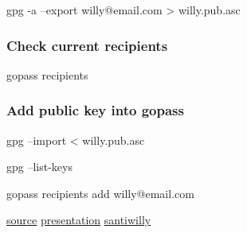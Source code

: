 \documentclass[9pt,english,a4paper,]{scrartcl}
\newenvironment{Shaded}{}{}
\newcommand{\ExtensionTok}[1]{#1}
\newcommand{\NormalTok}[1]{#1}
\newcommand{\OperatorTok}[1]{\textcolor[rgb]{0.40,0.40,0.40}{#1}}
\begin{document}
\begin{multicols}{3}
\begin{Shaded}
\begin{Highlighting}[]
\ExtensionTok{gpg}\NormalTok{ -a --export willy@email.com }\OperatorTok{>}\NormalTok{ willy.pub.asc}
\end{Highlighting}
\end{Shaded}

\hypertarget{check-current-recipients}{%
\subsubsection{Check current
recipients}\label{check-current-recipients}}

\begin{Shaded}
\begin{Highlighting}[]
\ExtensionTok{gopass}\NormalTok{ recipients}
\end{Highlighting}
\end{Shaded}

\hypertarget{add-public-key-into-gopass}{%
\subsubsection{Add public key into
gopass}\label{add-public-key-into-gopass}}

\begin{Shaded}
\begin{Highlighting}[]
\ExtensionTok{gpg}\NormalTok{ --import }\OperatorTok{<}\NormalTok{ willy.pub.asc}
\end{Highlighting}
\end{Shaded}

\begin{Shaded}
\begin{Highlighting}[]
\ExtensionTok{gpg}\NormalTok{ --list-keys}
\end{Highlighting}
\end{Shaded}

\begin{Shaded}
\begin{Highlighting}[]
\ExtensionTok{gopass}\NormalTok{ recipients add willy@email.com}
\end{Highlighting}
\end{Shaded}

\href{https://github.com/Woile/gopass-cheat-sheet}{source} \textbar{}
\href{https://woile.github.io/gopass-presentation/}{presentation}
\textbar{} \href{https://twitter.com/santiwilly}{santiwilly}
\end{multicols}
\end{document}
